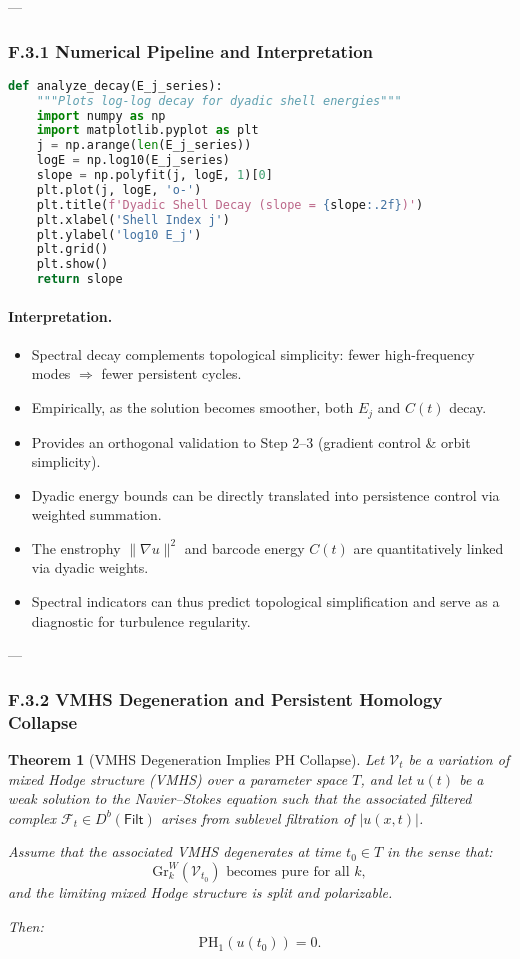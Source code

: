 \documentclass[11pt]{article}
\newtheorem{theorem}{Theorem}[section]
\theoremstyle{definition}
\begin{document}
---

\subsubsection*{F.3.1 Numerical Pipeline and Interpretation}

\begin{lstlisting}[language=Python]
def analyze_decay(E_j_series):
    """Plots log-log decay for dyadic shell energies"""
    import numpy as np
    import matplotlib.pyplot as plt
    j = np.arange(len(E_j_series))
    logE = np.log10(E_j_series)
    slope = np.polyfit(j, logE, 1)[0]
    plt.plot(j, logE, 'o-')
    plt.title(f'Dyadic Shell Decay (slope = {slope:.2f})')
    plt.xlabel('Shell Index j')
    plt.ylabel('log10 E_j')
    plt.grid()
    plt.show()
    return slope
\end{lstlisting}

\paragraph{Interpretation.}
\begin{itemize}
  \item Spectral decay complements topological simplicity: fewer high-frequency modes \(\Rightarrow\) fewer persistent cycles.
  \item Empirically, as the solution becomes smoother, both \( E_j \) and \( C(t) \) decay.
  \item Provides an orthogonal validation to Step 2--3 (gradient control \& orbit simplicity).
  \item Dyadic energy bounds can be directly translated into persistence control via weighted summation.
  \item The enstrophy \( \|\nabla u\|^2 \) and barcode energy \( C(t) \) are quantitatively linked via dyadic weights.
  \item Spectral indicators can thus predict topological simplification and serve as a diagnostic for turbulence regularity.
\end{itemize}

---

\subsubsection*{F.3.2 VMHS Degeneration and Persistent Homology Collapse}

\begin{theorem}[VMHS Degeneration Implies PH Collapse]
Let $\mathcal{V}_t$ be a variation of mixed Hodge structure (VMHS) over a parameter space $T$,  
and let $u(t)$ be a weak solution to the Navier–Stokes equation such that the associated filtered complex  
$\mathcal{F}_t \in D^b(\mathsf{Filt})$ arises from sublevel filtration of $|u(x,t)|$.

Assume that the associated VMHS degenerates at time $t_0 \in T$ in the sense that:
\[
\mathrm{Gr}^W_k(\mathcal{V}_{t_0}) \text{ becomes pure for all } k,
\]
and the limiting mixed Hodge structure is split and polarizable.

Then:
\[
\mathrm{PH}_1(u(t_0)) = 0.
\]
\end{theorem}
\end{document}
